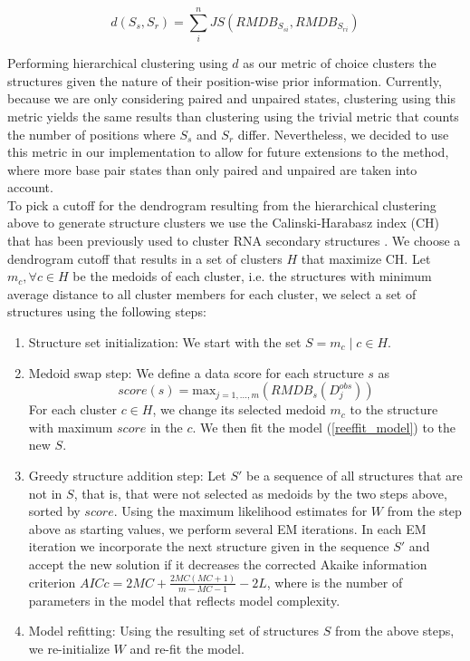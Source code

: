 \documentclass[12pt]{article}
\begin{document}
\[d(S_s, S_r) = \sum^n_i JS(RMDB_{S_{si}}, RMDB_{S_{ri}})\]

Performing hierarchical clustering using $d$ as our metric of choice clusters the structures given the nature of their position-wise prior information. 
Currently, because we are only considering paired and unpaired states, clustering using this metric yields the same results than clustering using the trivial metric that counts the number of positions where $S_s$ and $S_r$ differ. 
Nevertheless, we decided to use this metric in our implementation to allow for future extensions to the method, where more base pair states than only paired and unpaired are taken into account.\\
To pick a cutoff for the dendrogram resulting from the hierarchical clustering above to generate structure clusters we use the Calinski-Harabasz index (CH) that has been previously used to cluster RNA secondary structures \cite{Ding2005b}. 
We choose a dendrogram cutoff that results in a set of clusters $H$ that maximize CH. 
Let $m_c, \forall c \in H$ be the medoids of each cluster, i.e. the structures with minimum average distance to all cluster members for each cluster, we select a set of structures using the following steps:

\begin{enumerate}
\item Structure set initialization: We start with the set $S = {m_c \mid c \in H}$.
\item Medoid swap step: We define a data score for each structure $s$ as 
\[score(s) = \mbox{max}_{j = 1, ..., m}(RMDB_{s}(D^{obs}_{j}))\]
For each cluster $c \in H$, we change its selected medoid $m_c$ to the structure with maximum $score$ in the $c$. We then fit the model (\ref{reeffit_model}) to the new $S$.
\item Greedy structure addition step: Let $S'$ be a sequence of all structures that are not in $S$, that is, that were not selected as medoids by the two steps above, sorted by $score$. Using the maximum likelihood estimates for $W$ from the step above as starting values, we perform several EM iterations. In each EM iteration we incorporate the next structure given in the sequence $S'$ and accept the new solution if it decreases the corrected Akaike information criterion $AICc = 2MC +  \frac{2MC(MC+1)}{m-MC-1}  - 2L$, where is the number of parameters in the model that reflects model complexity.
\item Model refitting: Using the resulting set of structures $S$ from the above steps, we re-initialize $W$ and re-fit the model.
\end{enumerate}
\end{document}
